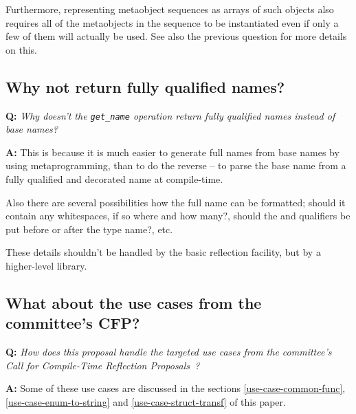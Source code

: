 Furthermore, representing metaobject sequences as arrays of such \verb@constexpr@
objects also requires all of the metaobjects in the sequence to be instantiated
even if only a few of them will actually be used. See also the previous
question for more details on this.

\subsection{Why not return fully qualified names?}

\textbf{Q:} {\em Why doesn't the \texttt{get\_name} operation return fully
qualified names instead of base names?}

\textbf{A:} This is because it is much easier to generate full names from
base names by using metaprogramming, than to do the reverse -- to parse the
base name from a fully qualified and decorated name at compile-time.

Also there are several possibilities how the full name can be formatted;
should it contain any whitespaces, if so where and how many?, should the
\verb@const@ and \verb@volatile@ qualifiers be put before or after the type
name?, etc.

These details shouldn't be handled by the basic reflection facility, but by
a higher-level library.

\subsection{What about the use cases from the committee's CFP?}

\textbf{Q:} {\em How does this proposal handle the targeted use cases
from the committee's Call for Compile-Time Reflection
Proposals~\cite{ISOCPP-N3814}?}

\textbf{A:} Some of these use cases are discussed in the sections
\ref{use-case-common-func}, \ref{use-case-enum-to-string}
and \ref{use-case-struct-transf} of this paper.

